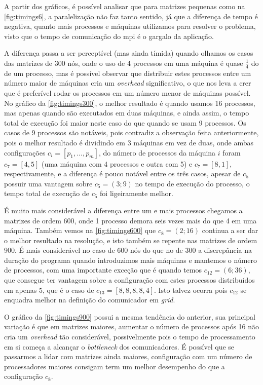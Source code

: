 A partir dos gráficos, é possível analisar que para matrizes pequenas como na \cref{fig:timings6},
a paralelização não faz tanto sentido, já que a diferença de tempo é negativa, quanto mais processos 
e máquinas utilizamos para resolver o problema, visto que o tempo de comunicação do \ac{mpi} é o 
gargalo da aplicação.

A diferença passa a ser perceptível (mas ainda tímida) quando olhamos os casos das matrizes de 300 nós, 
onde o uso de 4 processos em uma máquina é quase \(\frac{1}{4}\) do de um processo, mas é possível
observar que distribuir estes processos entre um número maior de máquinas cria um \emph{overhead}
significativo, o que nos leva a crer que é preferível rodar os processos em um número menor
de máquinas possível. No gráfico da \cref{fig:timings300}, o melhor resultado é quando usamos
16 processos, mas apenas quando são executados em duas máquinas, e ainda assim, o tempo total
de execução foi maior neste caso do que quando se usam 9 processos. Os casos de 9 processos
são notáveis, pois contradiz a observação feita anteriormente, pois o melhor resultado é dividindo
em 3 máquinas em vez de duas, onde ambas configurações \(c_i=[p_1,\ldots,p_m]\), do número de processos da máquina
\(i\) foram \(c_7=[4,5]\) (uma máquina com 4 processos e outra com 5) e \(c_7=[8,1]\), respectivamente, 
e a diferença é pouco notável entre os três casos, apesar de \(c_5\) possuir uma vantagem sobre 
\(c_5=(3;9)\) no tempo de execução do processo, o tempo total de execução de \(c_5\) foi ligeiramente
melhor.

É muito mais considerável a diferença entre um e mais processos  chegamos a matrizes de ordem
600, onde 1 processo demora seis vezes mais do que 4 em uma máquina. Também vemos na 
\cref{fig:timings600} que \(c_8=(2;16)\) continua a ser dar o melhor 
resultado na resolução, e isto também se repente nas matrizes de ordem 900. É mais 
considerável no caso de 600 nós do que no de 300 a discrepância na duração do
programa quando introduzimos mais máquinas e mantemos o número de processos, com 
uma importante exceção que é quando temos \(c_{12} = (6;36)\), que consegue
ter vantagem sobre a configuração com estes processos distribuídos em apenas 5,
que é o caso de \(c_{13} = [8,8,8,8,4]\). Isto talvez ocorra pois \(c_{12}\) 
se enquadra melhor na definição do comunicador em \emph{grid}.

O gráfico da \cref{fig:timings900} possui a mesma tendência do anterior,
sua principal variação é que em matrizes maiores, aumentar o número de processos
após 16 não cria um \emph{overhead} tão considerável, possivelmente pois
o tempo de processamento em si começa a alcançar o \emph{bottleneck} 
dos comunicadores. É possível que se passarmos a lidar com matrizes ainda 
maiores, configuração com um número de processadores maiores consigam 
term um melhor desempenho do que a configuração \(c_8\).
